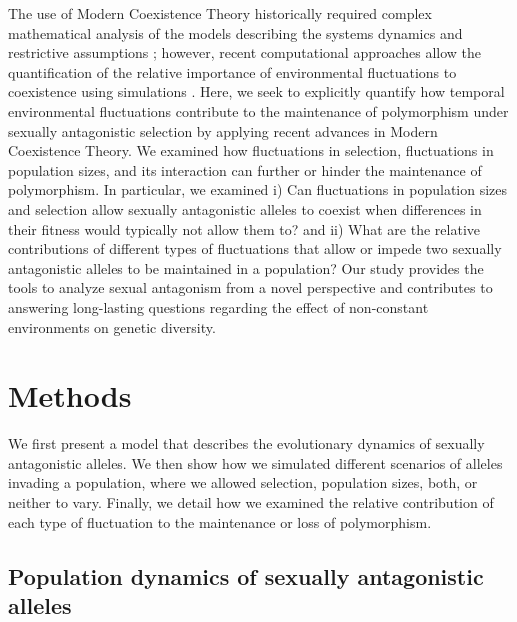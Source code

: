 \documentclass[12pt]{article}
\begin{document}
The use of Modern Coexistence Theory historically required complex mathematical analysis of the models describing the systems dynamics and restrictive assumptions \citep{barabas_chessons_2018}; however, recent computational approaches allow the quantification of the relative importance of environmental fluctuations to coexistence using simulations \citep{ellner2016quantify,ellner_expanded_2019,shoemaker2020}. Here, we seek to explicitly quantify how temporal environmental fluctuations contribute to the maintenance of polymorphism under sexually antagonistic selection by applying recent advances in Modern Coexistence Theory.  We examined how fluctuations in selection, fluctuations in population sizes, and its interaction can further or hinder the maintenance of polymorphism. In particular, we examined i) Can fluctuations in population sizes and selection allow sexually antagonistic alleles to coexist when differences in their fitness would typically not allow them to? and ii) What are the relative contributions of different types of fluctuations that allow or impede two sexually antagonistic alleles to be maintained in a population? Our study provides the tools to analyze sexual antagonism from a novel perspective and contributes to answering long-lasting questions regarding the effect of non-constant environments on genetic diversity.


\section{Methods}

We first present a model that describes the evolutionary dynamics of sexually antagonistic alleles. We then show how we simulated different scenarios of alleles invading a population, where we allowed selection, population sizes, both, or neither to vary. Finally, we detail how we examined the relative contribution of each type of fluctuation to the maintenance or loss of polymorphism.

\subsection*{Population dynamics of sexually antagonistic alleles}
\end{document}
